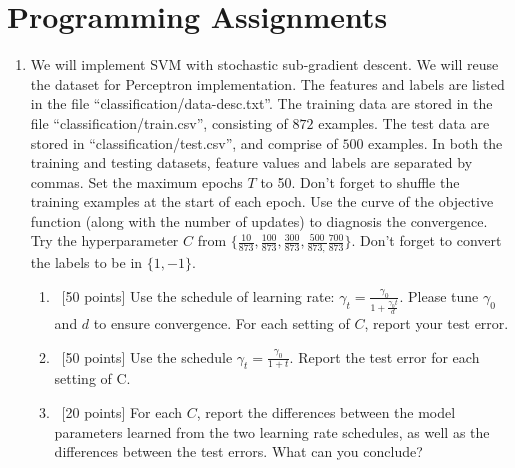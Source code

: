 \documentclass[12pt, fullpage,letterpaper]{article}
\begin{document}
\section{Programming Assignments}
\begin{enumerate}
\item We will implement  SVM with stochastic sub-gradient descent. We will reuse the dataset for Perceptron implementation. The features and labels are listed in the file ``classification/data-desc.txt''. The training data are stored in the file ``classification/train.csv'', consisting of $872$ examples. The test data are stored in ``classification/test.csv'', and comprise of $500$ examples. In both the training and testing datasets, feature values and labels are separated by commas. Set the maximum epochs $T$ to 50. Don't forget to shuffle the training examples at the start of each epoch. Use the curve of the objective function (along with the number of updates) to diagnosis the convergence. Try the hyperparameter $C$ from $\{\frac{10}{873}, \frac{100}{873}, \frac{300}{873}, \frac{500}{873,} \frac{700}{873}\}$. Don't forget to convert the labels to be in $\{1, -1\}$.  
\begin{enumerate}
\item~[50 points] Use the schedule of learning rate: $\gamma_t = \frac{\gamma_0}{1+\frac{\gamma_0 t}{d}}$. Please tune $\gamma_0$ and $d$ to ensure convergence. For each setting of $C$, report your test error. 
\item~[50 points] Use the schedule $\gamma_t = \frac{\gamma_0}{1+t}$. Report the test error for each setting of C. 
\item~[20 points] For each $C$, report the differences between the model parameters learned from the two learning rate schedules, as well as the differences between the test errors. What can you conclude? 
\end{enumerate}
\end{enumerate}
\end{document}
